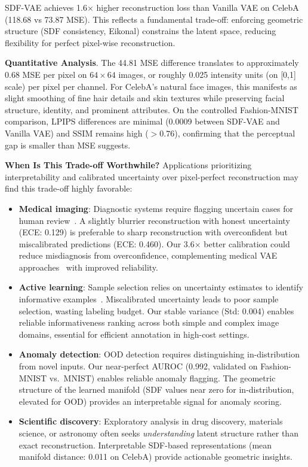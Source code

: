\documentclass[10pt,twocolumn,letterpaper]{article}
\begin{document}
SDF-VAE achieves 1.6$\times$ higher reconstruction loss than Vanilla VAE on CelebA (118.68 vs 73.87 MSE). This reflects a fundamental trade-off: enforcing geometric structure (SDF consistency, Eikonal) constrains the latent space, reducing flexibility for perfect pixel-wise reconstruction.

\textbf{Quantitative Analysis}. The 44.81 MSE difference translates to approximately 0.68 MSE per pixel on $64 \times 64$ images, or roughly 0.025 intensity units (on [0,1] scale) per pixel per channel. For CelebA's natural face images, this manifests as slight smoothing of fine hair details and skin textures while preserving facial structure, identity, and prominent attributes. On the controlled Fashion-MNIST comparison, LPIPS differences are minimal (0.0009 between SDF-VAE and Vanilla VAE) and SSIM remains high ($> 0.76$), confirming that the perceptual gap is smaller than MSE suggests.

\textbf{When Is This Trade-off Worthwhile?} Applications prioritizing interpretability and calibrated uncertainty over pixel-perfect reconstruction may find this trade-off highly favorable:

\begin{itemize}
\item \textbf{Medical imaging}: Diagnostic systems require flagging uncertain cases for human review~\cite{leibig2017medical}. A slightly blurrier reconstruction with honest uncertainty (ECE: 0.129) is preferable to sharp reconstruction with overconfident but miscalibrated predictions (ECE: 0.460). Our 3.6$\times$ better calibration could reduce misdiagnosis from overconfidence, complementing medical VAE approaches~\cite{uzunova2019medical} with improved reliability.

\item \textbf{Active learning}: Sample selection relies on uncertainty estimates to identify informative examples~\cite{gal2017active,settles2009active}. Miscalibrated uncertainty leads to poor sample selection, wasting labeling budget. Our stable variance (Std: 0.004) enables reliable informativeness ranking across both simple and complex image domains, essential for efficient annotation in high-cost settings.

\item \textbf{Anomaly detection}: OOD detection requires distinguishing in-distribution from novel inputs. Our near-perfect AUROC (0.992, validated on Fashion-MNIST vs.\ MNIST) enables reliable anomaly flagging. The geometric structure of the learned manifold (SDF values near zero for in-distribution, elevated for OOD) provides an interpretable signal for anomaly scoring.

\item \textbf{Scientific discovery}: Exploratory analysis in drug discovery, materials science, or astronomy often seeks \textit{understanding} latent structure rather than exact reconstruction. Interpretable SDF-based representations (mean manifold distance: 0.011 on CelebA) provide actionable geometric insights.
\end{itemize}
\end{document}
